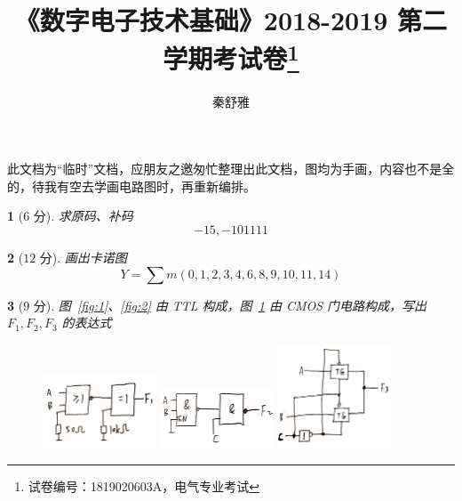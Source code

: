 \documentclass{ctexart}
\title{《数字电子技术基础》2018-2019 第二学期考试卷\thanks{试卷编号：1819020603A，电气专业考试}}
\author{秦舒雅}
\theoremstyle{change}
\newtheorem{ti}{}[section]
\begin{document}
	\pagestyle{plain}
	\maketitle
	此文档为“临时”文档，应朋友之邀匆忙整理出此文档，图均为手画，内容也不是全的，待我有空去学画电路图时，再重新编排。
	\begin{ti}[$6$ 分]
		求原码、补码
		\[
			-15,-101111
		\]
	\end{ti}

	\begin{ti}[$12$ 分]
		画出卡诺图
		\[
			Y = \sum m(0,1,2,3,4,6,8,9,10,11,14)
		\]
	\end{ti}

	\begin{ti}[$9$ 分]
		图~\ref{fig:1}、\ref{fig:2} 由 TTL 构成，图~\ref{fig:3} 由 CMOS 门电路构成，写出 $F_{1},F_{2},F_{3}$ 的表达式
		\begin{figure}[htbp]
			\centering
			\parbox[t]{0.5\textwidth}{%
				\centering
				\includegraphics[width=0.3\textwidth]{fig1.jpg}
				\caption{}\label{fig:1}
			}%
			\parbox[t]{0.5\textwidth}{%
				\centering
				\includegraphics[width=0.3\textwidth]{fig2.jpg}
				\caption{}\label{fig:2}
			}
			\parbox[t]{0.5\textwidth}{%
				\centering
				\includegraphics[width=0.3\textwidth]{fig3.jpg}
				\caption{}\label{fig:3}
			}%
		\end{figure}
	\end{ti}
\end{document}
